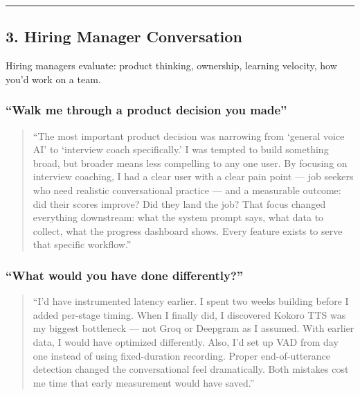 \documentclass[
  11pt,
]{article}
\begin{document}
\begin{center}\rule{0.5\linewidth}{0.5pt}\end{center}

\hypertarget{hiring-manager-conversation}{%
\subsection{3. Hiring Manager
Conversation}\label{hiring-manager-conversation}}

Hiring managers evaluate: product thinking, ownership, learning
velocity, how you'd work on a team.

\hypertarget{walk-me-through-a-product-decision-you-made}{%
\subsubsection{``Walk me through a product decision you
made''}\label{walk-me-through-a-product-decision-you-made}}

\begin{quote}
``The most important product decision was narrowing from `general voice
AI' to `interview coach specifically.' I was tempted to build something
broad, but broader means less compelling to any one user. By focusing on
interview coaching, I had a clear user with a clear pain point --- job
seekers who need realistic conversational practice --- and a measurable
outcome: did their scores improve? Did they land the job? That focus
changed everything downstream: what the system prompt says, what data to
collect, what the progress dashboard shows. Every feature exists to
serve that specific workflow.''
\end{quote}

\hypertarget{what-would-you-have-done-differently}{%
\subsubsection{``What would you have done
differently?''}\label{what-would-you-have-done-differently}}

\begin{quote}
``I'd have instrumented latency earlier. I spent two weeks building
before I added per-stage timing. When I finally did, I discovered Kokoro
TTS was my biggest bottleneck --- not Groq or Deepgram as I assumed.
With earlier data, I would have optimized differently. Also, I'd set up
VAD from day one instead of using fixed-duration recording. Proper
end-of-utterance detection changed the conversational feel dramatically.
Both mistakes cost me time that early measurement would have saved.''
\end{quote}
\end{document}
